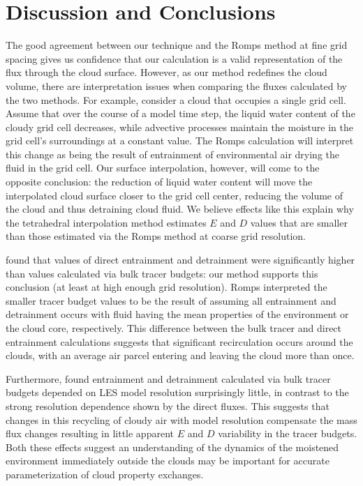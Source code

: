 \documentclass[12pt]{article}
\begin{document}

\section{Discussion and Conclusions}

The good agreement between our technique and the Romps method at fine grid 
spacing gives us confidence that our calculation is a valid representation 
of the flux through the cloud surface.  However, as our method redefines the 
cloud volume, there are interpretation issues when comparing the fluxes 
calculated by the two methods.  For example, consider a cloud that occupies a 
single grid cell.  Assume that over the course of a model time step, the 
liquid water content of the cloudy grid cell decreases, while advective 
processes maintain the moisture in the grid cell's surroundings at a constant 
value.  The Romps calculation will interpret this change as being the result 
of entrainment of environmental air drying the fluid in the grid cell.  Our 
surface interpolation, however, will come to the opposite conclusion: the 
reduction of liquid water content will move the interpolated cloud surface 
closer to the grid cell center, reducing the volume of the cloud and thus 
detraining cloud fluid.  We believe effects like this explain why the 
tetrahedral interpolation method estimates $E$ and $D$ values that are 
smaller than those estimated via the Romps method at coarse grid resolution.

\citet{Romps2010} found that values of direct entrainment and detrainment were 
significantly higher than values calculated via bulk tracer budgets: our 
method supports this conclusion (at least at high enough grid resolution).  
Romps interpreted the smaller tracer budget values to be the result of assuming
all entrainment and detrainment occurs with fluid having the mean properties of
the environment or the cloud core, respectively.  This difference between the 
bulk tracer and direct entrainment calculations suggests that significant 
recirculation occurs around the clouds, with an average air parcel entering 
and leaving the cloud more than once.  

Furthermore, \cite{Brown1999} found entrainment and detrainment calculated via
bulk tracer budgets depended on LES model resolution surprisingly little, in 
contrast to the strong resolution dependence shown by the direct fluxes.
This suggests that changes in this recycling of cloudy air with model 
resolution compensate the mass flux changes resulting in little apparent $E$ 
and $D$ variability in the tracer budgets.  Both these effects suggest an 
understanding of the dynamics of the moistened environment immediately outside 
the clouds may be important for accurate parameterization of cloud property 
exchanges.
\end{document}

